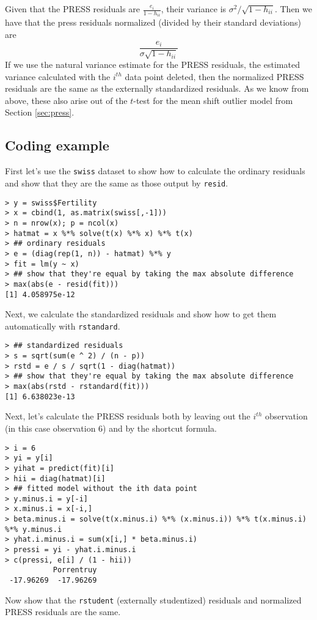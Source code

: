 Given that the PRESS residuals are $\frac{e_i}{1 - h_{ii}}$, their variance is
$\sigma^2 / \sqrt{1 - h_{ii}}$. Then we have that the press residuals normalized (divided
by their standard deviations) are 
$$
\frac{e_i}{\sigma \sqrt{1 - h_{ii}}}
$$
If we use the natural variance estimate for the PRESS residuals, the estimated variance calculated with
the $i^{th}$ data point deleted, then the normalized PRESS residuals are the same as the
externally standardized residuals. As we know from above, these also arise out of the $t$-test for the
mean shift outlier model from Section \ref{sec:press}. 

\subsection{Coding example}
First let's use the \texttt{swiss} dataset to show how to calculate
the ordinary residuals and show that they are the same as those
output by \texttt{resid}.
\begin{verbatim}
> y = swiss$Fertility
> x = cbind(1, as.matrix(swiss[,-1]))
> n = nrow(x); p = ncol(x)
> hatmat = x %*% solve(t(x) %*% x) %*% t(x)
> ## ordinary residuals
> e = (diag(rep(1, n)) - hatmat) %*% y
> fit = lm(y ~ x)
> ## show that they're equal by taking the max absolute difference
> max(abs(e - resid(fit)))
[1] 4.058975e-12
\end{verbatim}
Next, we calculate the standardized residuals and show how to get
them automatically with \texttt{rstandard}.
\begin{verbatim}
> ## standardized residuals
> s = sqrt(sum(e ^ 2) / (n - p))
> rstd = e / s / sqrt(1 - diag(hatmat))
> ## show that they're equal by taking the max absolute difference
> max(abs(rstd - rstandard(fit)))
[1] 6.638023e-13
\end{verbatim}
Next, let's calculate the PRESS residuals both by
leaving out the $i^{th}$ observation (in this case observation 6)
and by the shortcut formula.
\begin{verbatim}
> i = 6
> yi = y[i]
> yihat = predict(fit)[i]
> hii = diag(hatmat)[i]
> ## fitted model without the ith data point
> y.minus.i = y[-i]
> x.minus.i = x[-i,]
> beta.minus.i = solve(t(x.minus.i) %*% (x.minus.i)) %*% t(x.minus.i) %*% y.minus.i
> yhat.i.minus.i = sum(x[i,] * beta.minus.i)
> pressi = yi - yhat.i.minus.i
> c(pressi, e[i] / (1 - hii))
           Porrentruy 
 -17.96269  -17.96269 
\end{verbatim}
Now show that the \texttt{rstudent} (externally studentized) residuals and normalized
PRESS residuals are the same.
